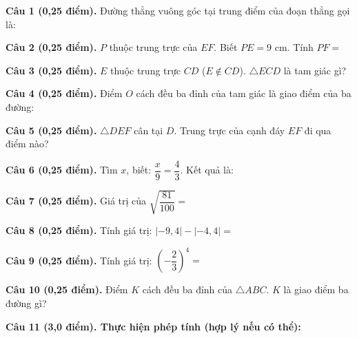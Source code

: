 \documentclass[12pt,a4paper]{article}
\begin{document}
\vspace{1.2mm}
\noindent\textbf{Câu 1 (0,25 điểm).} Đường thẳng vuông góc tại trung điểm của đoạn thẳng gọi là: \par\vspace{2.0mm}
\noindent\textbf{Câu 2 (0,25 điểm).} $P$ thuộc trung trực của $EF$. Biết $PE = 9\text{ cm}$. Tính $PF =$ \par\vspace{2.0mm}
\noindent\textbf{Câu 3 (0,25 điểm).} $E$ thuộc trung trực $CD$ ($E \notin CD$). $\triangle ECD$ là tam giác gì? \par\vspace{2.0mm}
\noindent\textbf{Câu 4 (0,25 điểm).} Điểm $O$ cách đều ba đỉnh của tam giác là giao điểm của ba đường: \par\vspace{2.0mm}
\noindent\textbf{Câu 5 (0,25 điểm).} $\triangle DEF$ cân tại $D$. Trung trực của cạnh đáy $EF$ đi qua điểm nào? \par\vspace{2.0mm}
\noindent\textbf{Câu 6 (0,25 điểm).} Tìm $x$, biết: $\dfrac{x}{9} = \dfrac{4}{3}$. Kết quả là: \par\vspace{2.0mm}
\noindent\textbf{Câu 7 (0,25 điểm).} Giá trị của $\sqrt{\dfrac{81}{100}} =$ \par\vspace{2.0mm}
\noindent\textbf{Câu 8 (0,25 điểm).} Tính giá trị: $|-9{,}4| - |-4{,}4| =$ \par\vspace{2.0mm}
\noindent\textbf{Câu 9 (0,25 điểm).} Tính giá trị: $\left(-\dfrac{2}{3}\right)^4 =$ \par\vspace{2.0mm}
\noindent\textbf{Câu 10 (0,25 điểm).} Điểm $K$ cách đều ba đỉnh của $\triangle ABC$. $K$ là giao điểm ba đường gì? \par\vspace{2.0mm}
\vspace{0.6mm}
\noindent\textbf{Câu 11 (3,0 điểm). Thực hiện phép tính (hợp lý nếu có thể):}
\vspace{0.6mm}
\end{document}
